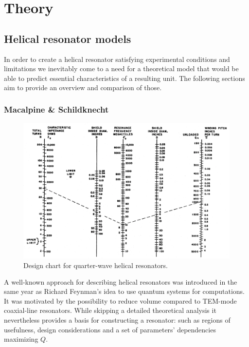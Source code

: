 \chapter{Theory}

\section{Helical resonator models}
In order to create a helical resonator satisfying experimental conditions and limitations we inevitably come to a need for a theoretical model that would be able to predict essential characteristics of a resulting unit. The following sections aim to provide an overview and comparison of those.

\subsection{Macalpine \& Schildknecht}
\begin{figure}[h]
	\includegraphics[width=\textwidth]{images/macalpine_chart}
	\caption{Design chart for quarter-wave helical resonators.}
	\label{fig:macalpine_chart}
\end{figure}

A well-known approach \cite{Macalpine2000} for describing helical resonators was introduced in the same year as Richard Feynman's idea \cite{Feynman1960} to use quantum systems for computations. It was motivated by the possibility to reduce volume compared to TEM-mode coaxial-line resonators. While skipping a detailed theoretical analysis it nevertheless provides a basis for constructing a resonator: such as regions of usefulness, design considerations and a set of parameters' dependencies maximizing $Q$.

